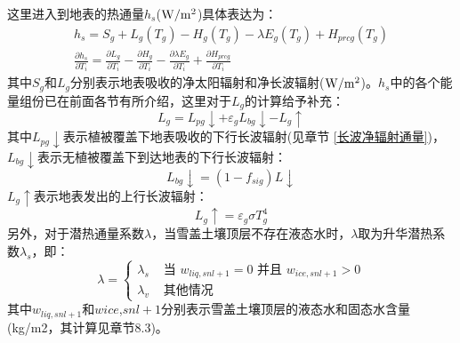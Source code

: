这里进入到地表的热通量$h_s$($\rm W/m^2$)具体表达为：
\begin{equation}
\begin{array}{c}h_{s}=S_{g}+L_{g}\left(T_{g}\right)-H_{g}\left(T_{g}\right)-\lambda E_{g}\left(T_{g}\right)+H_{p r c g}\left(T_{g}\right) \\ \frac{\partial h_{s}}{\partial T_{i}}=\frac{\partial L_{g}}{\partial T_{i}}-\frac{\partial H_{g}}{\partial T_{i}}-\frac{\partial \lambda E_{g}}{\partial T_{i}}+\frac{\partial H_{p r c g}}{\partial T_{i}}\end{array}
\end{equation}
其中$S_g$和$L_g$分别表示地表吸收的净太阳辐射和净长波辐射($\rm W/m^2$)。$h_s$中的各个能量组份已在前面各节有所介绍，这里对于$L_g$的计算给予补充：
\begin{equation}
L_{g}=L_{p g} \downarrow+\varepsilon_{g} L_{b g} \downarrow-L_{g} \uparrow
\end{equation}
其中$L_{pg}\downarrow$表示植被覆盖下地表吸收的下行长波辐射(见章节 \ref{长波净辐射通量})，$L_{bg}\downarrow$表示无植被覆盖下到达地表的下行长波辐射：
\begin{equation}
L_{b g} \downarrow=\left(1-f_{ sig }\right) L \downarrow
\end{equation}
$L_g\uparrow$表示地表发出的上行长波辐射：
\begin{equation}
L_{g} \uparrow=\varepsilon_{g} \sigma T_{g}^{4}
\end{equation}
另外，对于潜热通量系数$\lambda$，当雪盖土壤顶层不存在液态水时，$\lambda$取为升华潜热系数$\lambda_s$，即：
\begin{equation}
\lambda=\left\{\begin{array}{lr}\lambda_{s} & \text { 当 } w_{liq, s n l+1}=0 \text { 并且 } w_{ice, s n l+1}>0 \\ \lambda_{v} & \text { 其他情况 }\end{array}\right.
\end{equation}
其中$w_{liq,snl+1}$和$wice$,$snl+1$分别表示雪盖土壤顶层的液态水和固态水含量(kg/m2，其计算见章节8.3)。


